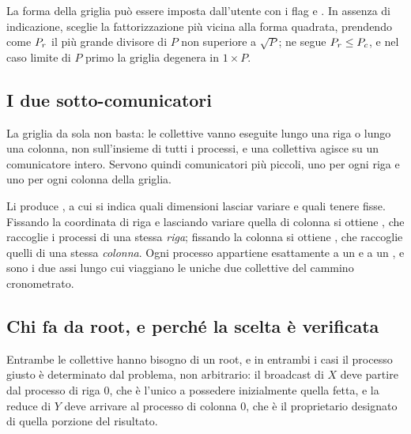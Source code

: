 La forma della griglia può essere imposta dall'utente con i flag  e
. In assenza di indicazione,  sceglie la
fattorizzazione più vicina alla forma quadrata, prendendo come $P_r$ il più
grande divisore di $P$ non superiore a $\sqrt{P}$; ne segue
$P_r \le P_c$, e nel caso limite di $P$ primo la griglia degenera in
$1 \times P$.


\subsection{I due sotto-comunicatori}

La griglia da sola non basta: le collettive vanno eseguite lungo una riga o
lungo una colonna, non sull'insieme di tutti i processi, e una collettiva
agisce su un comunicatore intero. Servono quindi comunicatori più piccoli, uno
per ogni riga e uno per ogni colonna della griglia.

Li produce , a cui si indica quali dimensioni lasciar
variare e quali tenere fisse. Fissando la coordinata di riga e lasciando
variare quella di colonna si ottiene , che raccoglie i
processi di una stessa \emph{riga}; fissando la colonna si ottiene
, che raccoglie quelli di una stessa \emph{colonna}. Ogni
processo appartiene esattamente a un  e a un ,
e sono i due assi lungo cui viaggiano le uniche due collettive del cammino
cronometrato.

\subsection{Chi fa da root, e perché la scelta è verificata}

Entrambe le collettive hanno bisogno di un root, e in entrambi i casi il
processo giusto è determinato dal problema, non arbitrario: il broadcast di
$X$ deve partire dal processo di riga $0$, che è l'unico a possedere
inizialmente quella fetta, e la reduce di $Y$ deve arrivare al processo di
colonna $0$, che è il proprietario designato di quella porzione del risultato.


